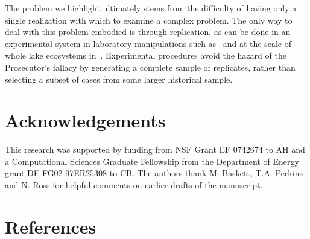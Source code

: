 \documentclass[authoryear,review,12pt]{elsarticle}
\begin{document}
The problem we highlight ultimately stems from the difficulty of having
only a single realization with which to examine a complex problem.
The only way to deal with this problem embodied is through replication, as
can be done in an experimental system in laboratory manipulations
such as~\citet{Drake2010, Veraart2011, Dai2012} and at the scale of whole lake
ecosystems in~\citet{Carpenter2011}.  
Experimental procedures avoid the hazard of the Prosecutor's fallacy by
generating a complete sample of replicates, rather than selecting a subset
of cases from some larger historical sample.  





 \section{Acknowledgements}
This research was supported by funding from NSF Grant EF 0742674 to AH
and a Computational Sciences Graduate Fellowship from the Department of
Energy grant DE-FG02-97ER25308 to CB. The authors thank M. Baskett, 
T.A. Perkins and N. Ross for helpful comments on earlier drafts of the
manuscript.  

 \section{References}%
\end{document}
